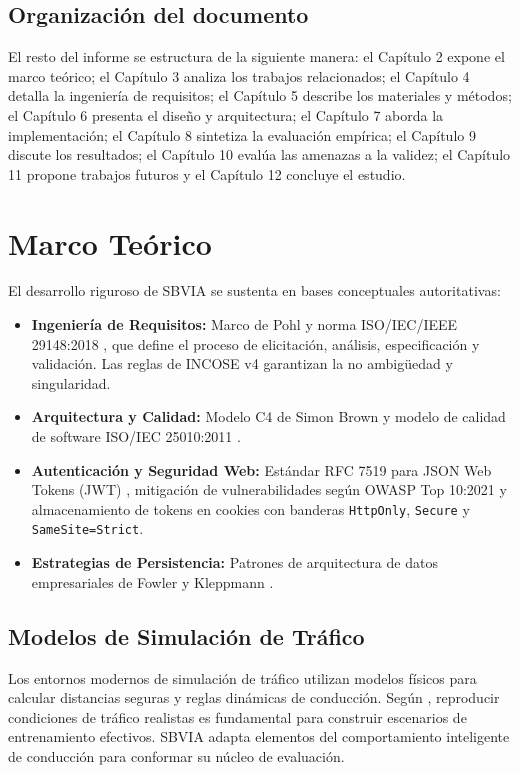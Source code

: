 \documentclass[11pt,a4paper]{report}
\begin{document}
\section{Organización del documento}
El resto del informe se estructura de la siguiente manera: el Capítulo 2 expone el marco teórico; el Capítulo 3 analiza los trabajos relacionados; el Capítulo 4 detalla la ingeniería de requisitos; el Capítulo 5 describe los materiales y métodos; el Capítulo 6 presenta el diseño y arquitectura; el Capítulo 7 aborda la implementación; el Capítulo 8 sintetiza la evaluación empírica; el Capítulo 9 discute los resultados; el Capítulo 10 evalúa las amenazas a la validez; el Capítulo 11 propone trabajos futuros y el Capítulo 12 concluye el estudio.

\chapter{Marco Teórico}
El desarrollo riguroso de SBVIA se sustenta en bases conceptuales autoritativas:
\begin{itemize}
    \item \textbf{Ingeniería de Requisitos:} Marco de Pohl \cite{pohl2010requirements} y norma ISO/IEC/IEEE 29148:2018 \cite{iso29148}, que define el proceso de elicitación, análisis, especificación y validación. Las reglas de INCOSE v4 \cite{incose2023} garantizan la no ambigüedad y singularidad.
    \item \textbf{Arquitectura y Calidad:} Modelo C4 de Simon Brown \cite{brown2023c4} y modelo de calidad de software ISO/IEC 25010:2011 \cite{iso25010}.
    \item \textbf{Autenticación y Seguridad Web:} Estándar RFC 7519 para JSON Web Tokens (JWT) \cite{rfc7519}, mitigación de vulnerabilidades según OWASP Top 10:2021 \cite{owasp2021} y almacenamiento de tokens en cookies con banderas \texttt{HttpOnly}, \texttt{Secure} y \texttt{SameSite=Strict}.
    \item \textbf{Estrategias de Persistencia:} Patrones de arquitectura de datos empresariales de Fowler \cite{fowler2002patterns} y Kleppmann \cite{kleppmann2017designing}.
\end{itemize}

\section{Modelos de Simulación de Tráfico}
Los entornos modernos de simulación de tráfico utilizan modelos físicos para calcular distancias seguras y reglas dinámicas de conducción. Según \cite{treiber2013traffic}, reproducir condiciones de tráfico realistas es fundamental para construir escenarios de entrenamiento efectivos. SBVIA adapta elementos del comportamiento inteligente de conducción para conformar su núcleo de evaluación.
\end{document}
